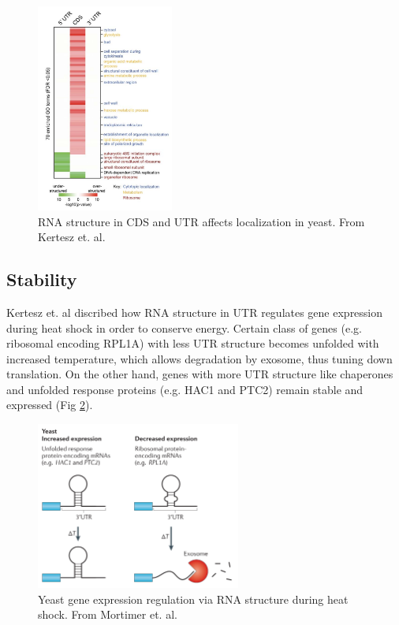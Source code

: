 \documentclass{proposal}
\begin{document}
\begin{figure}[h!]
    \centering
    \includegraphics[width=0.4\textwidth]{yeast_localization.png}
    \caption{RNA structure in CDS and UTR affects localization in yeast. From Kertesz et. al\cite{kertesz2010genome}.}
    \label{fig:yeast_localization}
    \centering
\end{figure}



\subsection*{Stability}


Kertesz et. al\cite{kertesz2010genome} discribed how RNA structure in UTR regulates gene expression during heat shock in order to conserve energy.
Certain class of genes (e.g. ribosomal encoding ﻿RPL1A) with less UTR structure becomes unfolded with increased temperature,
which allows degradation by exosome, thus tuning down translation.
On the other hand, genes with more UTR structure like ﻿chaperones and unfolded response proteins (e.g. HAC1 and PTC2) remain stable and expressed (Fig \ref{fig:yeast_stability}).

\begin{figure}[h!]
    \centering
    \includegraphics[width=0.6\textwidth]{yeast_stability.png}
    \caption{Yeast gene expression regulation via RNA structure during heat shock. From Mortimer et. al\cite{mortimer2014insights}.}
    \label{fig:yeast_stability}
    \centering
\end{figure}
\end{document}
